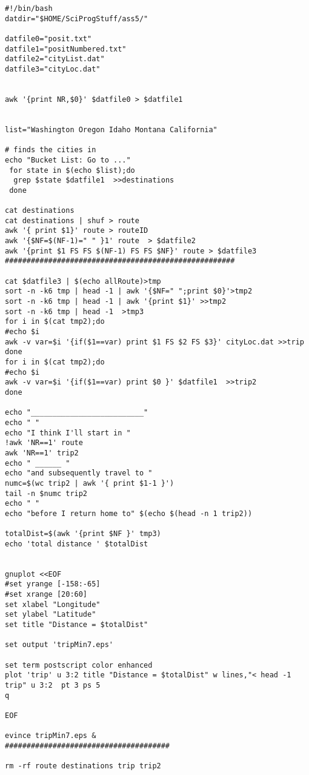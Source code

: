 \documentclass{article}
\begin{document}
\begin{verbatim}
#!/bin/bash
datdir="$HOME/SciProgStuff/ass5/"

datfile0="posit.txt"
datfile1="positNumbered.txt"
datfile2="cityList.dat"
datfile3="cityLoc.dat"


awk '{print NR,$0}' $datfile0 > $datfile1


list="Washington Oregon Idaho Montana California"

# finds the cities in 
echo "Bucket List: Go to ..."
 for state in $(echo $list);do
  grep $state $datfile1  >>destinations
 done

cat destinations 
cat destinations | shuf > route
awk '{ print $1}' route > routeID
awk '{$NF=$(NF-1)=" " }1' route  > $datfile2
awk '{print $1 FS FS $(NF-1) FS FS $NF}' route > $datfile3
#####################################################

cat $datfile3 | $(echo allRoute)>tmp 
sort -n -k6 tmp | head -1 | awk '{$NF=" ";print $0}'>tmp2
sort -n -k6 tmp | head -1 | awk '{print $1}' >>tmp2
sort -n -k6 tmp | head -1  >tmp3
for i in $(cat tmp2);do
#echo $i
awk -v var=$i '{if($1==var) print $1 FS $2 FS $3}' cityLoc.dat >>trip
done
for i in $(cat tmp2);do
#echo $i
awk -v var=$i '{if($1==var) print $0 }' $datfile1  >>trip2
done

echo "__________________________"
echo " "
echo "I think I'll start in "
!awk 'NR==1' route
awk 'NR==1' trip2
echo " ______ "
echo "and subsequently travel to "
numc=$(wc trip2 | awk '{ print $1-1 }')
tail -n $numc trip2
echo " "
echo "before I return home to" $(echo $(head -n 1 trip2))

totalDist=$(awk '{print $NF }' tmp3)
echo 'total distance ' $totalDist


gnuplot <<EOF
#set yrange [-158:-65]
#set xrange [20:60]
set xlabel "Longitude"
set ylabel "Latitude"
set title "Distance = $totalDist"

set output 'tripMin7.eps'

set term postscript color enhanced
plot 'trip' u 3:2 title "Distance = $totalDist" w lines,"< head -1 trip" u 3:2  pt 3 ps 5
q

EOF

evince tripMin7.eps &
######################################

rm -rf route destinations trip trip2


\end{verbatim}
\end{document}
